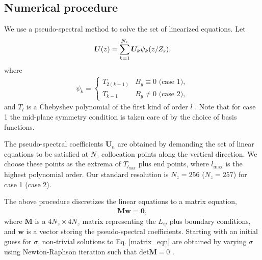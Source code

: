 

\subsection{Numerical procedure}
We use a pseudo-spectral method to solve the set of linearized
equations. Let
\begin{align}\label{cheby_expand}
  \bm{U}(z) 
  = \sum_{k=1}^{N_z} \bm{U}_k\psi_k(z/Z_s), 
\end{align}
where 
\begin{align}
  \psi_k  = 
  \begin{cases}
    T_{2(k-1)} & B_y \equiv 0 \text{ (case 1)},\\
    T_{k-1}   & B_y\neq 0 \text{ (case 2)},
  \end{cases}
\end{align}
and  $T_l$ is a Chebyshev polynomial of the first kind of order $l$
\citep{stegun65}. Note that for case 1 the mid-plane symmetry condition
is taken care of by the choice of basis functions. 

The pseudo-spectral coefficients $\bm{U}_n$  are obtained by demanding
the set of linear equations to be satisfied at $N_z$ collocation
points along the vertical direction. We choose these points as the
extrema of $T_{l_\mathrm{max}}$ plus end points, where
$l_\mathrm{max}$ is the highest polynomial order. Our standard
resolution is $N_z=256$ ($N_z=257$) for case 1 (case 2).   

The above procedure discretizes the linear equations to a matrix equation,
\begin{align}\label{matrix_eqn}
\bm{M}\bm{w} = \mathbf{0}, 
\end{align}
where $\bm{M}$ is a $4N_z\times 4 N_z$ matrix representing the $L_{ij}$ 
plus boundary conditions, 
and $\bm{w}$ is a vector storing the pseudo-spectral coefficients. 
Starting with an initial guess for $\sigma$, non-trivial solutions to
Eq. \ref{matrix_eqn} are obtained by varying $\sigma$ using Newton-Raphson iteration 
such that $\mathrm{det}\bm{M}=0$ \citep[details can be found in][]{lin12}.



